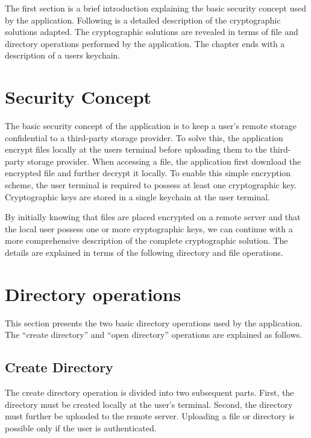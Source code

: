 \documentclass[pdftex,english,10pt,b5paper,twoside]{book}
\begin{document}

The first section is a brief introduction explaining the basic
security concept used by the application. Following is a detailed description of
the cryptographic solutions adapted. The cryptographic solutions are revealed
in terms of file and directory operations performed by the application. The
chapter ends with a description of a users keychain.

\section{Security Concept}

The basic security concept of the application is to keep a user's remote storage
confidential to a third-party storage provider. To solve this, the application
encrypt files locally at the users terminal before uploading them to the
third-party storage provider. When accessing a file, the application first
download the encrypted file and further decrypt it locally. To enable this
simple encryption scheme, the user terminal is required to possess at least one
cryptographic key. Cryptographic keys are stored in a single keychain at the user
terminal.

By initially knowing that files are placed encrypted on a remote server and that
the local user possess one or more cryptographic keys, we can continue with a
more comprehensive description of the complete cryptographic solution. The
details are explained in terms of the following directory and file operations.

\section{Directory operations}
\label{sec:CS:DO}

This section presents the two basic directory operations used by the
application. The ``create directory'' and ``open directory'' operations are
explained as follows.

\subsection{Create Directory}

The create directory operation is divided into two subsequent parts. First, the
directory must be created locally at the user's terminal. Second, the directory
must further be uploaded to the remote server.  Uploading a file or directory is
possible only if the user is authenticated.
\end{document}
